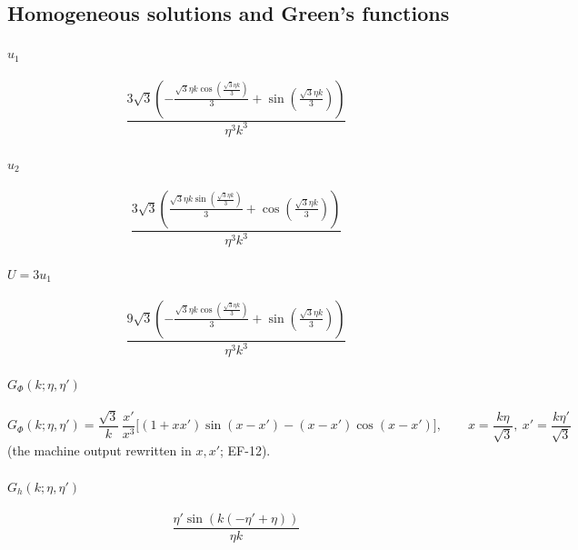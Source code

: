 \subsection{Homogeneous solutions and Green's functions}

\paragraph{$u_1$}
\begin{dmath}
\frac{3 \sqrt{3} \left(- \frac{\sqrt{3} \eta k \cos{\left(\frac{\sqrt{3} \eta k}{3} \right)}}{3} + \sin{\left(\frac{\sqrt{3} \eta k}{3} \right)}\right)}{\eta^{3} k^{3}}
\end{dmath}

\paragraph{$u_2$}
\begin{dmath}
\frac{3 \sqrt{3} \left(\frac{\sqrt{3} \eta k \sin{\left(\frac{\sqrt{3} \eta k}{3} \right)}}{3} + \cos{\left(\frac{\sqrt{3} \eta k}{3} \right)}\right)}{\eta^{3} k^{3}}
\end{dmath}

\paragraph{$U=3u_1$}
\begin{dmath}
\frac{9 \sqrt{3} \left(- \frac{\sqrt{3} \eta k \cos{\left(\frac{\sqrt{3} \eta k}{3} \right)}}{3} + \sin{\left(\frac{\sqrt{3} \eta k}{3} \right)}\right)}{\eta^{3} k^{3}}
\end{dmath}

\paragraph{$G_\Phi(k;\eta,\eta')$}
\begin{equation*}
G_\Phi(k;\eta,\eta')=\frac{\sqrt3}{k}\,\frac{x'}{x^3}\Big[(1+xx')\sin(x-x')-(x-x')\cos(x-x')\Big],\qquad x=\frac{k\eta}{\sqrt3},\ x'=\frac{k\eta'}{\sqrt3}
\end{equation*}
(the machine output rewritten in $x,x'$; EF-12).

\paragraph{$G_h(k;\eta,\eta')$}
\begin{dmath}
\frac{\eta' \sin{\left(k \left(- \eta' + \eta\right) \right)}}{\eta k}
\end{dmath}

